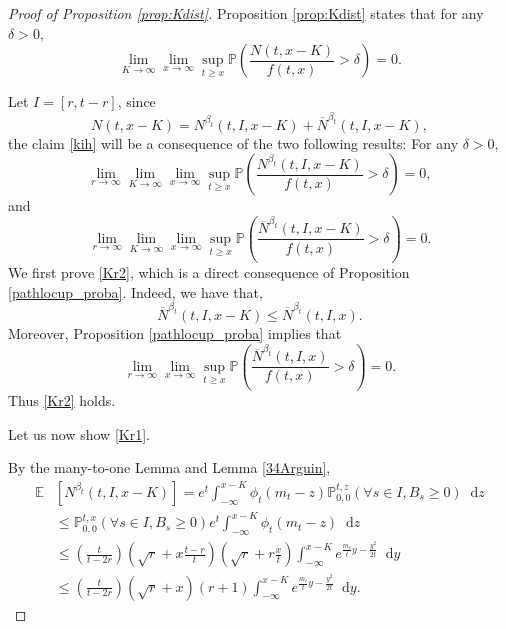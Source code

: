 \documentclass{article}
\newcommand{\NOB}[2]{\overline{N}^{#1}(#2)}
\newcommand{\E}[0]{\mathbb{E}}
\newcommand{\Prob}{\mathbb{P}}
\begin{document}
\begin{proof}[Proof of Proposition \ref{prop:Kdist}] Proposition \ref{prop:Kdist} states that for any $\delta>0$,
\begin{equation}\label{kih}
    \lim_{K\to\infty} \lim_{x\to\infty} \sup_{t\geq x}\Prob\left(\frac{N(t,x-K)}{f(t,x)} > \delta\right) = 0.
\end{equation}

Let $I=[r,t-r]$, since
\begin{equation}
    N(t,x-K)=N^{\beta_t}(t,I,x-K) + \NOB{\beta_t}{t,I,x-K} ,
\end{equation}
the claim \eqref{kih} will be a consequence of the two following results:
For any $\delta>0$, 
\begin{equation}\label{Kr1}
    \lim_{r\to \infty}\lim_{K\to\infty} \lim_{x\to\infty} \sup_{t\geq x}\Prob\left(\frac{N^{\beta_t}(t,I,x-K)}{f(t,x)} > \delta\right) = 0,
\end{equation}
and 
\begin{equation}\label{Kr2}
    \lim_{r\to \infty}\lim_{K\to\infty} \lim_{x\to\infty} \sup_{t\geq x}\Prob\left(\frac{\NOB{\beta_t}{t,I,x-K}}{f(t,x)} > \delta\right) = 0.
\end{equation}
We first prove \eqref{Kr2}, which is a direct consequence of Proposition \ref{pathlocup_proba}. Indeed, we have that,
\begin{equation}
     \NOB{\beta_t}{t,I,x-K}\leq  \NOB{\beta_t}{t,I,x}.
\end{equation}
Moreover, Proposition \ref{pathlocup_proba} implies that 
\begin{equation}
    \lim_{r\to \infty}\lim_{x\to\infty}\sup_{t\geq x}\Prob\left(\frac{\NOB{\beta_t}{t,I,x}}{f(t,x)} > \delta\right) = 0.
\end{equation}
Thus \eqref{Kr2} holds.

Let us now show \eqref{Kr1}.


By the many-to-one Lemma and Lemma \ref{34Arguin}, 
    \begin{equation}\label{gfdgd93}
    \begin{split}
         \E&\left[ N^{\beta_t}(t,I,x-K) \right]=e^t  \int_{-\infty}^{x -K} \phi_t(m_t -z) 
           \Prob_{0,0}^{t,z}(\forall s\in I, B_s \geq 0)\mathop{}\!\mathrm{d}z
           \\& \leq  \Prob_{0,0}^{t,x}(\forall s\in I, B_s \geq 0)e^t \int_{-\infty}^{x -K} \phi_t(m_t -z) \mathop{}\!\mathrm{d}z
           \\& \leq \left(\frac{t}{t-2r}\right)\left(\sqrt{r}+x\frac{t-r}{t}\right)\left(\sqrt{r}+r\frac{x}{t}\right)\int_{-\infty}^{x -K} e^{\frac{m_t}{t}y -\frac{y^2}{2t}}\mathop{}\!\mathrm{d}y
           \\& \leq \left(\frac{t}{t-2r}\right)(\sqrt{r}+x)(r+1)\int_{-\infty}^{x -K} e^{\frac{m_t}{t}y -\frac{y^2}{2t}}\mathop{}\!\mathrm{d}y.
    \end{split}
    \end{equation}


\end{proof}
\end{document}
